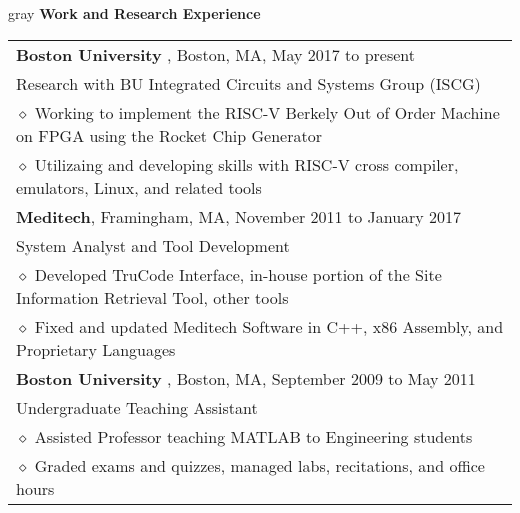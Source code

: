 \documentclass[10.5pt,letterpaper]{article}
\newcommand{\org}[1]{\textbf{#1}}
\newcommand{\pseudoitem}{\diamond}
\newcommand{\vertspace}{\vspace{1.2mm}}
\newcommand{\horzindent}{\hspace{3mm}}
\newcommand{\minorindent}{\hspace{4.5mm}}
\newcommand{\minoritem}{\minorindent $\pseudoitem$ }
\newcommand{\tablewidth}{.9\linewidth}
\newcommand{\undergrad}{Boston University}
\newcommand{\grad}{Boston University}
\begin{document}
	\fi
			
	\vertspace
	\noindent
	\begin{heading}{gray}
		\textbf{Work and Research Experience} 
	\end{heading}
		\begin{tabular*}{\tablewidth}{@{\extracolsep{\fill}}l}
			\org{\grad} , Boston, MA, May 2017 to present\\
			\horzindent Research with BU Integrated Circuits and Systems Group (ISCG)\\
			\minoritem Working to implement the RISC-V Berkely Out of Order Machine on FPGA using the Rocket Chip Generator\\
			\minoritem Utilizaing and developing skills with RISC-V cross compiler, emulators, Linux, and related tools\\
			\org{Meditech}, Framingham, MA, November 2011 to January 2017\\
			\horzindent System Analyst and Tool Development \\
			\minoritem Developed TruCode Interface, in-house portion of the Site Information Retrieval Tool, other tools \\
			\minoritem Fixed and updated Meditech Software in C++, x86 Assembly, and Proprietary Languages \\
			\org{\undergrad} , Boston, MA, September 2009 to May 2011 \\
			\horzindent Undergraduate Teaching Assistant \\
			\minoritem Assisted Professor teaching MATLAB to Engineering students \\
			\minoritem Graded exams and quizzes, managed labs, recitations, and office hours \\
		\end{tabular*}
	
\end{document}
